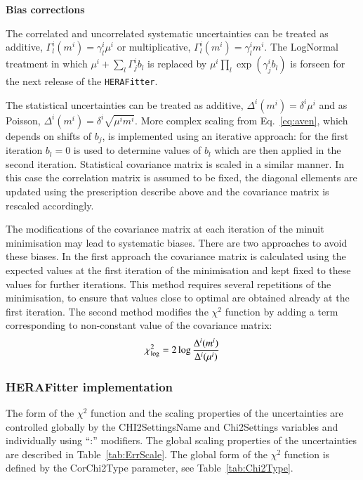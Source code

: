 \begin{description}
\item \bf{Bias corrections}\rm

The correlated and uncorrelated systematic uncertainties can be treated as additive,  $\Gamma^i_l(m^i) = \gamma^i_l \mu^i$
or multiplicative, $\Gamma^i_l(m^i) = \gamma^i_l m^i$. The LogNormal treatment in which 
$ \mu^i + \sum_l \Gamma^i_j b_l$ is replaced by $ \mu^i \prod_l \exp( \gamma^i_j b_l) $ is forseen for the
next release of the {\tt HERAFitter}. 

The statistical uncertainties can be treated as additive, $\Delta^i(m^i) = \delta^i \mu^i$  and as Poisson,
$\Delta^i(m^i) = \delta^i \sqrt{\mu^i m^i}$. More complex scaling from Eq.~\ref{eq:aven}, 
which depends on shifts of $b_j$, is implemented using an iterative approach: for the first iteration $b_l =0$ 
 is used to determine values of $b_l$ which are then applied in the second iteration. Statistical covariance
matrix is scaled in a similar manner. In this case the correlation matrix is assumed to be fixed, the diagonal
ellements are updated using the prescription describe above and the covariance matrix is rescaled accordingly.

The modifications of the covariance matrix at each iteration of the minuit minimisation may lead to systematic
biases. There are two approaches to avoid these biases. In the first approach the covariance matrix is calculated
using the expected values at the first iteration of the minimisation and kept fixed to these values for further
iterations. This method requires several repetitions of the minimisation, to ensure that values close to optimal
are obtained already at the first iteration. The second method modifies the $\chi^2$ function by adding a term
corresponding to non-constant value of the covariance matrix:
\begin{equation}
 \chi^2_{\rm log} = 2 \log \frac{\Delta^i(m^i)}{\Delta^i(\mu^i)} 
\end{equation}  
\end{description}


\subsubsection{HERAFitter implementation}
The form of the $\chi^2$ function and the scaling properties of the 
uncertainties are controlled globally by the {\sc CHI2SettingsName} and
{\sc  Chi2Settings} variables and individually using {\sc ``:''} modifiers.
The global scaling properties of the uncertainties are described in 
Table~\ref{tab:ErrScale}. The global form of the $\chi^2$ function
is defined by the {\sc CorChi2Type} parameter, see   
Table~\ref{tab:Chi2Type}.


